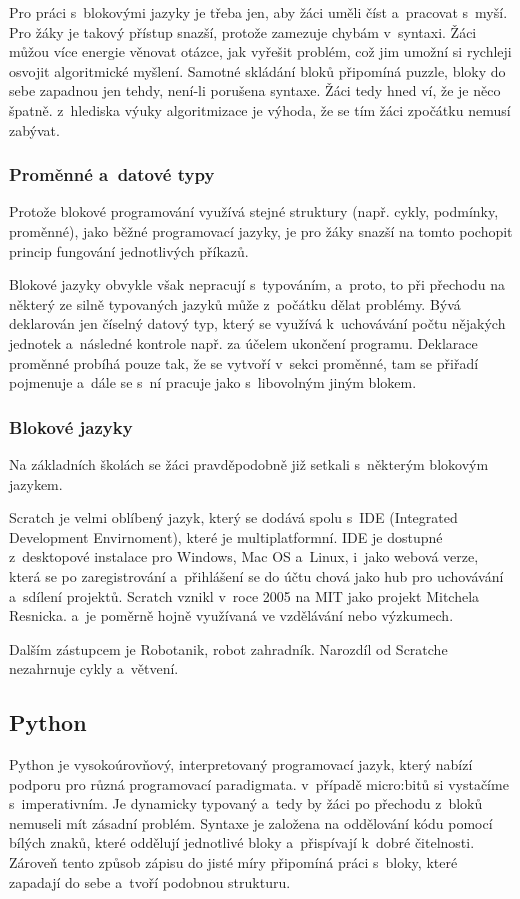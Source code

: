 \documentclass[
  digital,     %
  oneside,     %
  nosansbold,  %
  colorbold, %
  lof,         %
  nolot,         %
]{fithesis4}
\begin{document}
Pro práci s~blokovými jazyky je třeba jen, aby žáci uměli číst a~pracovat s~myší. Pro žáky je takový přístup snazší, protože zamezuje chybám v~syntaxi. Žáci můžou více energie věnovat otázce, jak vyřešit problém, což jim umožní si rychleji osvojit algoritmické myšlení. Samotné skládání bloků připomíná puzzle, bloky do sebe zapadnou jen tehdy, není-li porušena syntaxe. Žáci tedy hned ví, že je něco špatně. z~hlediska výuky algoritmizace je výhoda, že se tím žáci zpočátku nemusí zabývat.

\subsubsection{Proměnné a~datové typy}
Protože blokové programování využívá stejné struktury (např. cykly, podmínky, proměnné), jako běžné programovací jazyky, je pro žáky snazší na tomto pochopit princip fungování jednotlivých příkazů. 

Blokové jazyky obvykle však nepracují s~typováním, a~proto, to při přechodu na některý ze silně typovaných jazyků může z~počátku dělat problémy. Bývá deklarován jen číselný datový typ, který se využívá k~uchovávání počtu nějakých jednotek a~následné kontrole např. za účelem ukončení programu. Deklarace proměnné probíhá pouze tak, že se vytvoří v~sekci proměnné, tam se přiřadí pojmenuje a~dále se s~ní pracuje jako s~libovolným jiným blokem.

\subsubsection{Blokové jazyky}
Na základních školách se žáci pravděpodobně již setkali s~některým blokovým jazykem.

Scratch je velmi oblíbený jazyk, který se dodává spolu s~IDE (Integrated Development Envirnoment), které je multiplatformní. IDE je dostupné z~desktopové instalace pro Windows, Mac OS a~Linux, i~jako webová verze, která se po zaregistrování a~přihlášení se do účtu chová jako hub pro uchovávání a~sdílení projektů. Scratch vznikl v~roce 2005 na MIT jako projekt Mitchela Resnicka. a~je poměrně hojně využívaná ve vzdělávání nebo výzkumech.

Dalším zástupcem je Robotanik, robot zahradník. Narozdíl od Scratche nezahrnuje cykly a~větvení.

\subsection{Python}
Python je vysokoúrovňový, interpretovaný programovací jazyk, který nabízí podporu pro různá programovací paradigmata. v~případě micro:bitů si vystačíme s~imperativním. Je dynamicky typovaný a~tedy by žáci po přechodu z~bloků nemuseli mít zásadní problém. Syntaxe je založena na oddělování kódu pomocí bílých znaků, které oddělují jednotlivé bloky a~přispívají k~dobré čitelnosti. Zároveň tento způsob zápisu do jisté míry připomíná práci s~bloky, které zapadají do sebe a~tvoří podobnou strukturu.
\end{document}
